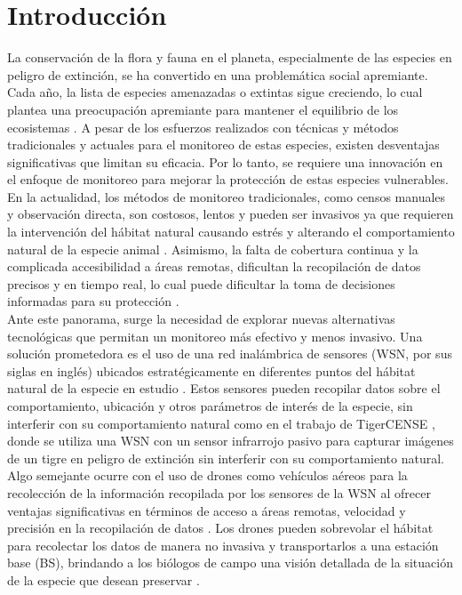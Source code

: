 
\chapter{Introducción}

La conservación de la flora y fauna en el planeta, especialmente de las especies en peligro de extinción, se ha convertido en una problemática social apremiante. Cada año, la lista de especies amenazadas o extintas sigue creciendo, lo cual plantea una preocupación apremiante para mantener el equilibrio de los ecosistemas \cite{1}. A pesar de los esfuerzos realizados con técnicas y métodos tradicionales y actuales para el monitoreo de estas especies, existen desventajas significativas que limitan su eficacia. Por lo tanto, se requiere una innovación en el enfoque de monitoreo para mejorar la protección de estas especies vulnerables.\\
En la actualidad, los métodos de monitoreo tradicionales, como censos manuales y observación directa, son costosos, lentos y pueden ser invasivos ya que requieren la intervención del hábitat natural causando estrés y alterando el comportamiento natural de la especie animal \cite{2}. Asimismo, la falta de cobertura continua y la complicada accesibilidad a áreas remotas, dificultan la recopilación de datos precisos y en tiempo real, lo cual puede dificultar la toma de decisiones informadas para su protección \cite{3}. \\
Ante este panorama, surge la necesidad de explorar nuevas alternativas tecnológicas que permitan un monitoreo más efectivo y menos invasivo. Una solución prometedora es el uso de una red inalámbrica de sensores (WSN, por sus siglas en inglés) ubicados estratégicamente en diferentes puntos del hábitat natural de la especie en estudio \cite{4}. Estos sensores pueden recopilar datos sobre el comportamiento, ubicación y otros parámetros de interés de la especie, sin interferir con su comportamiento natural como en el trabajo de TigerCENSE \cite{5}, donde se utiliza una WSN con un sensor infrarrojo pasivo para capturar imágenes de un tigre en peligro de extinción sin interferir con su comportamiento natural.\\
Algo semejante ocurre con el uso de drones como vehículos aéreos para la recolección de la información recopilada por los sensores de la WSN al ofrecer ventajas significativas en términos de acceso a áreas remotas, velocidad y precisión en la recopilación de datos \cite{6}. Los drones pueden sobrevolar el hábitat para recolectar los datos de manera no invasiva y transportarlos a una estación base (BS), brindando a los biólogos de campo una visión detallada de la situación de la especie que desean preservar \cite{7}.\\
